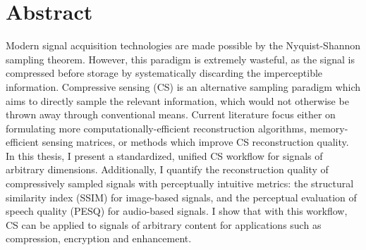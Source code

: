 \chapter*{Abstract}

Modern signal acquisition technologies are made possible by the Nyquist-Shannon sampling theorem. However, this paradigm is extremely wasteful, as the signal is compressed before storage by systematically discarding the imperceptible information. Compressive sensing (CS) is an alternative sampling paradigm which aims to directly sample the relevant information, which would not otherwise be thrown away through conventional means. Current literature focus either on formulating more computationally-efficient reconstruction algorithms, memory-efficient sensing matrices, or methods which improve CS reconstruction quality. In this thesis, I present a standardized, unified CS workflow for signals of arbitrary dimensions. Additionally, I quantify the reconstruction quality of compressively sampled signals with perceptually intuitive metrics: the structural similarity index (SSIM) for image-based signals, and the perceptual evaluation of speech quality (PESQ) for audio-based signals. I show that with this workflow, CS can be applied to signals of arbitrary content for applications such as compression, encryption and enhancement.